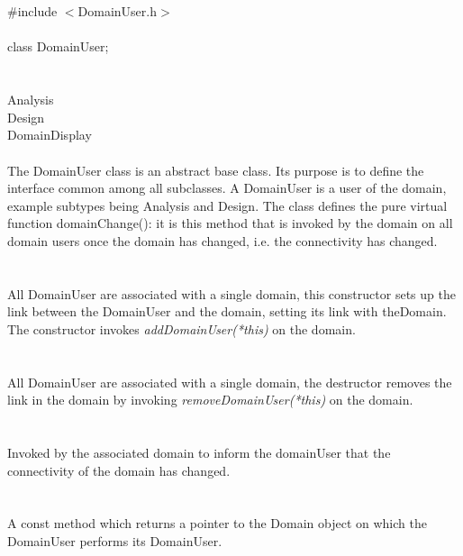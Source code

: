 
 \\

   \\
\indent \#include $<$DomainUser.h$>$  \\

  \\
\indent class DomainUser;  \\

 \\
 \\
\indent\indent Analysis \\
\indent\indent Design \\
\indent\indent DomainDisplay \\

 \\ 
\indent The DomainUser class is an abstract base class. Its purpose is
to define the interface common among all subclasses.  A DomainUser is
a user of the domain, example subtypes being Analysis and Design. The
class defines the pure virtual function domainChange(): it is
this method that is invoked by the domain on all domain users once the
domain has changed, i.e. the connectivity has changed. \\

\\ \\ 
All DomainUser are associated with a single domain, this constructor
sets up the link between the DomainUser and the domain, setting its link
with theDomain. The constructor invokes {\em addDomainUser(*this)} on
the domain. \\  

 \\
\\ 
All DomainUser are associated with a single domain, the destructor
removes the link in the domain by invoking {\em removeDomainUser(*this)}
on the domain. \\

\\
 \\
Invoked by the associated domain to inform the domainUser that the
connectivity of the domain has changed. \\


  \\
 \\
A const method which returns a pointer to the Domain object on which
the DomainUser performs its DomainUser.




